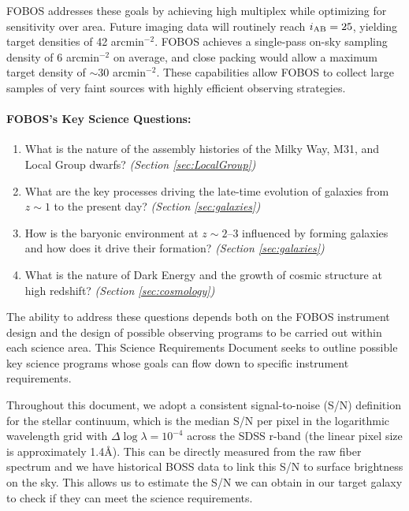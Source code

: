 \documentclass[11pt,a4paper,twoside,onecolumn,openany,final,oldfontcommands]{memoir}
\begin{document}
FOBOS addresses these goals by achieving high multiplex while optimizing for sensitivity over area.  Future imaging data will routinely reach $i_{\rm AB} = 25$, yielding target densities of 42 arcmin$^{-2}$.  FOBOS achieves a single-pass on-sky sampling density of 6 arcmin$^{-2}$ on average, and close packing would allow a maximum target density of $\sim$30 arcmin$^{-2}$.  These capabilities allow FOBOS to collect large samples of very faint sources with highly efficient observing strategies. 

\paragraph{FOBOS's Key Science Questions:}

\begin{enumerate} 
\item What is the nature of the assembly histories of the Milky Way, M31, and Local Group dwarfs?  {\em (Section \ref{sec:LocalGroup})}
\item What are the key processes driving the late-time evolution of galaxies from $z\sim 1$ to the present day? {\em (Section \ref{sec:galaxies})}
\item How is the baryonic environment at $z \sim 2$--3 influenced by forming galaxies and how does it drive their formation? {\em (Section \ref{sec:galaxies})}
\item What is the nature of Dark Energy and the growth of cosmic structure at high redshift? {\em (Section \ref{sec:cosmology})}
\end{enumerate}

The ability to address these questions depends both on the FOBOS instrument design and the design of possible observing programs to be carried out within each science area.  This Science Requirements Document seeks to outline possible key science programs whose goals can flow down to specific instrument requirements.


Throughout this document, we adopt a consistent signal-to-noise (S/N) definition for the stellar continuum, which is the median S/N per pixel in the logarithmic wavelength grid with $\Delta \log \lambda = 10^{-4}$ across the SDSS r-band (the linear pixel size is approximately 1.4\AA). This can be directly measured from the raw fiber spectrum and we have historical BOSS data to link this S/N to surface brightness on the sky. This allows us to estimate the S/N we can obtain in our target galaxy to check if they can meet the science requirements.
\end{document}
